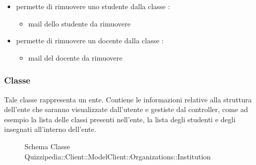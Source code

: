 \begin{itemize}
\newline
\item {}
\newline
permette di rimuovere uno studente dalla
classe
\newline
{} :
\begin{itemize}
\item {}
\newline
mail dello studente da rimuovere
\end{itemize}
\item {}
\newline
permette di rimuovere un docente dalla
classe
\newline
{} :
\begin{itemize}
\item {}
\newline
mail del docente da rimuovere
\end{itemize}
\end{itemize}
\subsubsection{Classe }
Tale classe rappresenta un ente. Contiene le informazioni relative alla struttura dell'ente che saranno visualizzate dall'utente e gestiste dal controller, come ad esempio la lista delle classi presenti nell'ente, la lista degli studenti e degli insegnati all'interno dell'ente.
\begin{figure}[H]
\centering
\noindent{}
\caption[Schema Classe Institution]{Schema Classe Quizzipedia::Client::ModelClient::Organizations::Institution}
\end{figure}
